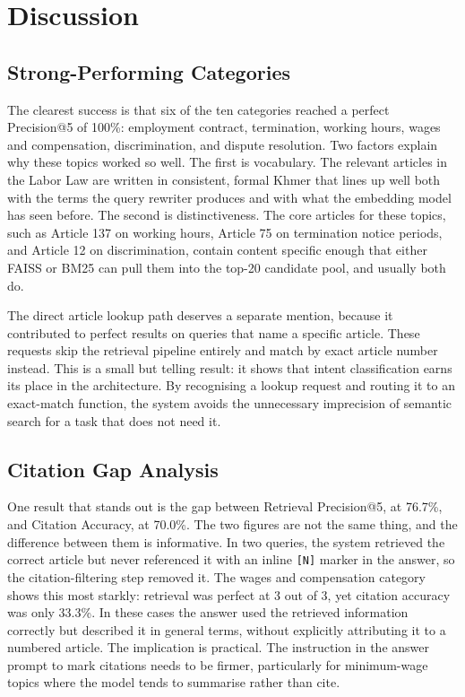 \section{Discussion}

\subsection{Strong-Performing Categories}

\hs The clearest success is that six of the ten categories reached a perfect Precision@5
of 100\%: employment contract, termination, working hours, wages and compensation,
discrimination, and dispute resolution. Two factors explain why these topics worked so
well. The first is vocabulary. The relevant articles in the Labor Law are written in
consistent, formal Khmer that lines up well both with the terms the query rewriter
produces and with what the embedding model has seen before. The second is distinctiveness.
The core articles for these topics, such as Article 137 on working hours, Article 75 on
termination notice periods, and Article 12 on discrimination, contain content specific
enough that either FAISS or BM25 can pull them into the top-20 candidate pool, and usually
both do.

\hs The direct article lookup path deserves a separate mention, because it contributed to
perfect results on queries that name a specific article. These requests skip the retrieval
pipeline entirely and match by exact article number instead. This is a small but telling
result: it shows that intent classification earns its place in the architecture. By
recognising a lookup request and routing it to an exact-match function, the system avoids
the unnecessary imprecision of semantic search for a task that does not need it.

\subsection{Citation Gap Analysis}

\hs One result that stands out is the gap between Retrieval Precision@5, at 76.7\%, and
Citation Accuracy, at 70.0\%. The two figures are not the same thing, and the difference
between them is informative. In two queries, the system retrieved the correct article but
never referenced it with an inline \texttt{[N]} marker in the answer, so the
citation-filtering step removed it. The wages and compensation category shows this most
starkly: retrieval was perfect at 3 out of 3, yet citation accuracy was only 33.3\%. In
these cases the answer used the retrieved information correctly but described it in general
terms, without explicitly attributing it to a numbered article. The implication is
practical. The instruction in the answer prompt to mark citations needs to be firmer,
particularly for minimum-wage topics where the model tends to summarise rather than cite.

